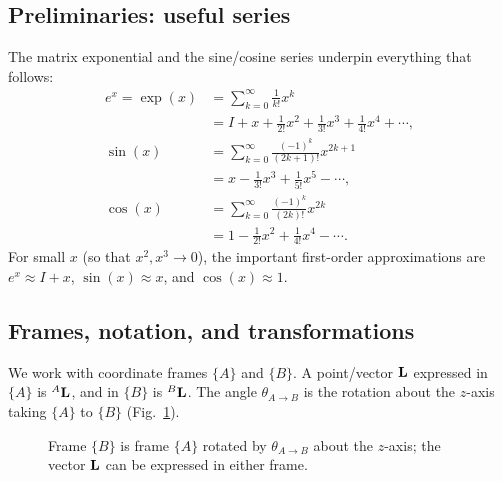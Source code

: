\subsection{Preliminaries: useful series}
The matrix exponential and the sine/cosine series underpin everything that follows:
\begin{align}
e^{x} = \exp(x) &= \sum_{k=0}^{\infty}\frac{1}{k!}x^{k} \\
&= I + x + \tfrac{1}{2!}x^{2} + \tfrac{1}{3!}x^{3} + \tfrac{1}{4!}x^{4} + \cdots, \\
\sin(x) &= \sum_{k=0}^{\infty}\frac{(-1)^{k}}{(2k+1)!}x^{2k+1} \\
&= x - \tfrac{1}{3!}x^{3} + \tfrac{1}{5!}x^{5} - \cdots, \\
\cos(x) &= \sum_{k=0}^{\infty}\frac{(-1)^{k}}{(2k)!}x^{2k} \\
&= 1 - \tfrac{1}{2!}x^{2} + \tfrac{1}{4!}x^{4} - \cdots.
\end{align}
For small $x$ (so that $x^2,x^3\to 0$), the important first-order approximations are $e^{x}\approx I + x$, $\sin(x)\approx x$, and $\cos(x)\approx 1$.

\subsection{Frames, notation, and transformations}

We work with coordinate frames $\{A\}$ and $\{B\}$. A point/vector $\boldsymbol{\mathbf{L}}$ expressed in $\{A\}$ is ${}^{A}\boldsymbol{\mathbf{L}}$, and in $\{B\}$ is ${}^{B}\boldsymbol{\mathbf{L}}$. The angle $\theta_{A\to B}$ is the rotation about the $z$-axis taking $\{A\}$ to $\{B\}$ (Fig.~\ref{fig:lec02-frames}).

\begin{figure}[H]
\centering
{}
\caption{Frame $\{B\}$ is frame $\{A\}$ rotated by $\theta_{A\to B}$ about the $z$-axis; the vector $\boldsymbol{\mathbf{L}}$ can be expressed in either frame.}
\label{fig:lec02-frames}
\end{figure}


